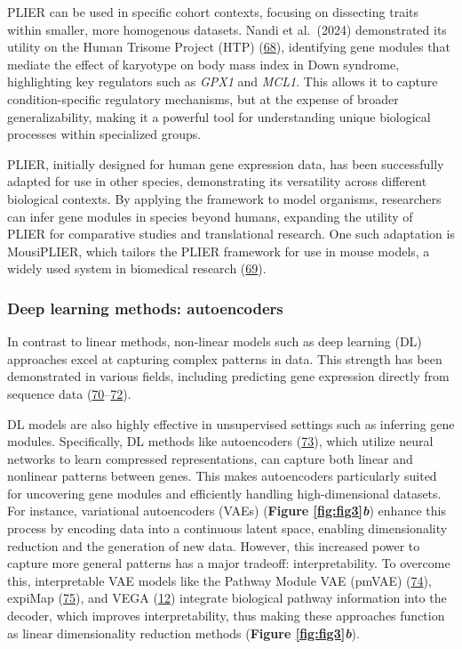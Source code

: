 PLIER can be used in specific cohort contexts, focusing on dissecting traits within smaller, more homogenous datasets.
Nandi et al.~(2024) demonstrated its utility on the Human Trisome Project (HTP) (\protect\hyperlink{ref-v5DtVejF}{68}), identifying gene modules that mediate the effect of karyotype on body mass index in Down syndrome, highlighting key regulators such as \emph{GPX1} and \emph{MCL1}.
This allows it to capture condition-specific regulatory mechanisms, but at the expense of broader generalizability, making it a powerful tool for understanding unique biological processes within specialized groups.

PLIER, initially designed for human gene expression data, has been successfully adapted for use in other species, demonstrating its versatility across different biological contexts.
By applying the framework to model organisms, researchers can infer gene modules in species beyond humans, expanding the utility of PLIER for comparative studies and translational research.
One such adaptation is MousiPLIER, which tailors the PLIER framework for use in mouse models, a widely used system in biomedical research (\protect\hyperlink{ref-1CDQw6VDO}{69}).

\hypertarget{deep-learning-methods-autoencoders}{%
\subsubsection{Deep learning methods: autoencoders}\label{deep-learning-methods-autoencoders}}

In contrast to linear methods, non-linear models such as deep learning (DL) approaches excel at capturing complex patterns in data.
This strength has been demonstrated in various fields, including predicting gene expression directly from sequence data (\protect\hyperlink{ref-1HNaN8NTb}{70}--\protect\hyperlink{ref-Gy0Zkruj}{72}).

DL models are also highly effective in unsupervised settings such as inferring gene modules.
Specifically, DL methods like autoencoders (\protect\hyperlink{ref-NLVTJ9Lj}{73}), which utilize neural networks to learn compressed representations, can capture both linear and nonlinear patterns between genes.
This makes autoencoders particularly suited for uncovering gene modules and efficiently handling high-dimensional datasets.
For instance, variational autoencoders (VAEs) (\textbf{Figure \ref{fig:fig3}\emph{b}}) enhance this process by encoding data into a continuous latent space, enabling dimensionality reduction and the generation of new data.
However, this increased power to capture more general patterns has a major tradeoff: interpretability.
To overcome this, interpretable VAE models like the Pathway Module VAE (pmVAE) (\protect\hyperlink{ref-nGVsOd2S}{74}), expiMap (\protect\hyperlink{ref-JkqcQgM7}{75}), and VEGA (\protect\hyperlink{ref-170T6ip47}{12}) integrate biological pathway information into the decoder, which improves interpretability, thus making these approaches function as linear dimensionality reduction methods
(\textbf{Figure \ref{fig:fig3}\emph{b}}).

